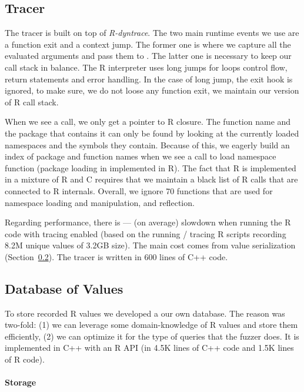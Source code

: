 \documentclass[sigplan,anonymous,review]{acmart}
\begin{document}
\subsection{Tracer}\label{sec:argtracer}

The tracer is built on top of \emph{R-dyntrace}.
The two main runtime events we use are a function exit and a context jump.
The former one is where we capture all the evaluated arguments and pass them to \sxpdb.
The latter one is necessary to keep our call stack in balance.
The R interpreter uses long jumps for loops control flow, return statements and error handling.
In the case of long jump, the exit hook is ignored, to make sure, we do not loose any function exit, we maintain our version of R call stack.

When we see a call, we only get a pointer to R closure.
The function name and the package that contains it can only be found by looking at the currently loaded namespaces and the symbols they contain.
Because of this, we eagerly build an index of package and function names when we see a call to load namespace function (package loading in implemented in R).
The fact that R is implemented in a mixture of R and C requires that we maintain a black list of R calls that are connected to R internals.
Overall, we ignore 70 functions that are used for namespace loading and manipulation, and reflection.

Regarding performance, there is \TRMinTracingOverhead --- \TRMaxTracingOverhead (\TRAvgTracingOverhead on average) slowdown when running the R code with tracing enabled (based on the running / tracing \TRTracingFiles R scripts recording 8.2M unique values of 3.2GB size).
The main cost comes from value serialization (\Cf Section~\ref{sec:sxpdb}).
The tracer is written in 600 lines of C++ code.

\subsection{Database of Values}\label{sec:sxpdb}

To store recorded R values we developed a our own database.
The reason was two-fold: (1) we can leverage some domain-knowledge of R values and store them efficiently, (2) we can optimize it for the type of queries that the fuzzer does.
It is implemented in C++ with an R API (in 4.5K lines of C++ code and 1.5K lines of R code).

\paragraph{Storage}
\end{document}
